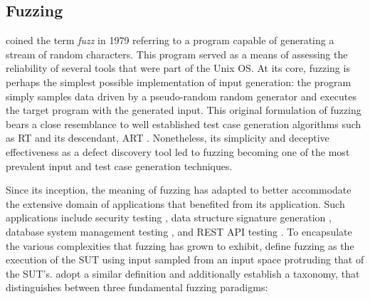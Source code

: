 \subsection{Fuzzing}

\citet{miller1990empirical} coined the term \textit{fuzz} in 1979 referring
to a program capable of generating a stream of random characters.
This program served as a means of assessing
the reliability of several tools that were part of the Unix \Gls{OS}.
At its core, fuzzing is perhaps the simplest possible implementation
of input generation: the program simply samples data
driven by a pseudo-random random generator and executes
the target program with the generated input.
This original formulation of fuzzing bears a close
resemblance to well established test case generation algorithms
such as \Gls{RT} \cite{duran1981report} and 
its descendant, \Gls{ART} \cite{chen2010adaptive}.
Nonetheless, its simplicity and deceptive effectiveness
as a defect discovery tool led to fuzzing becoming one
of the most prevalent input and test case generation techniques.

Since its inception, the meaning of fuzzing has adapted to
better accommodate the extensive domain of applications that
benefited from its application.
Such applications include security testing \cite{oehlert2005violating, stephens2016driller},
data structure signature generation \cite{dolan2009robust}, 
database system management testing \cite{zhong2020squirrel},
and REST API testing \cite{atlidakis2019restler, godefroid2020intelligent}.
To encapsulate the various complexities that fuzzing has grown
to exhibit, \citet{manes2019art} define fuzzing as the execution
of the \gls{SUT} using input sampled from an input space protruding
that of the \gls{SUT}'s.
\citet{saavedra2019review} adopt a similar definition and additionally
establish a taxonomy, that distinguishes between three 
fundamental fuzzing paradigms:


